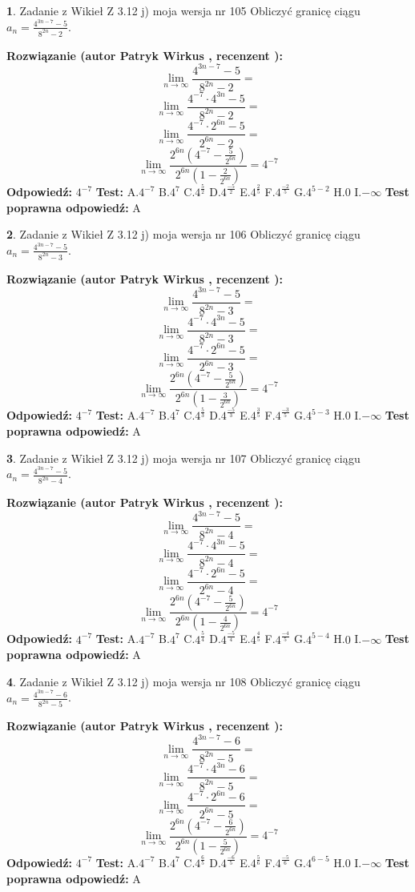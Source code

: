 \documentclass[12pt, a4paper]{article}
\theoremstyle{definition} %
\newtheorem{zad}{}
\newcommand{\zadStart}[1]{\begin{zad}#1\newline}
\newcommand{\zadStop}{\end{zad}}
\newcommand{\rozwStart}[2]{\noindent \textbf{Rozwiązanie (autor #1 , recenzent #2): }\newline}
\newcommand{\rozwStop}{\newline}
\newcommand{\odpStart}{\noindent \textbf{Odpowiedź:}\newline}
\newcommand{\odpStop}{\newline}
\newcommand{\testStart}{\noindent \textbf{Test:}\newline}
\newcommand{\testStop}{\newline}
\newcommand{\kluczStart}{\noindent \textbf{Test poprawna odpowiedź:}\newline}
\newcommand{\kluczStop}{\newline}
\begin{document}
\zadStart{Zadanie z Wikieł Z 3.12 j) moja wersja nr 105}
Obliczyć granicę ciągu $a_{n}=\frac{4^{3n-7}-5}{8^{2n}-2}$.
\zadStop
\rozwStart{Patryk Wirkus}{}
$$\lim\limits_{n\to\infty}\frac{4^{3n-7}-5}{8^{2n}-2}=$$
$$\lim\limits_{n\to\infty}\frac{4^{-7} \cdot 4^{3n}-5}{8^{2n}-2}=$$
$$\lim\limits_{n\to\infty}\frac{4^{-7} \cdot 2^{6n}-5}{2^{6n}-2}=$$
$$\lim\limits_{n\to\infty}\frac{2^{6n}(4^{-7} - \frac{5}{2^{6n}})}{2^{6n}(1-\frac{2}{2^{6n}})}= 4^{-7}$$
\rozwStop
\odpStart
$4^{-7}$
\odpStop
\testStart
A.$4^{-7}$
B.$4^{7}$
C.$4^{\frac{5}{2}}$
D.$4^{\frac{-5}{2}}$
E.$4^{\frac{2}{5}}$
F.$4^{\frac{-2}{5}}$
G.$4^{5-2}$
H.$0$
I.$-\infty$
\testStop
\kluczStart
A
\kluczStop



\zadStart{Zadanie z Wikieł Z 3.12 j) moja wersja nr 106}
Obliczyć granicę ciągu $a_{n}=\frac{4^{3n-7}-5}{8^{2n}-3}$.
\zadStop
\rozwStart{Patryk Wirkus}{}
$$\lim\limits_{n\to\infty}\frac{4^{3n-7}-5}{8^{2n}-3}=$$
$$\lim\limits_{n\to\infty}\frac{4^{-7} \cdot 4^{3n}-5}{8^{2n}-3}=$$
$$\lim\limits_{n\to\infty}\frac{4^{-7} \cdot 2^{6n}-5}{2^{6n}-3}=$$
$$\lim\limits_{n\to\infty}\frac{2^{6n}(4^{-7} - \frac{5}{2^{6n}})}{2^{6n}(1-\frac{3}{2^{6n}})}= 4^{-7}$$
\rozwStop
\odpStart
$4^{-7}$
\odpStop
\testStart
A.$4^{-7}$
B.$4^{7}$
C.$4^{\frac{5}{3}}$
D.$4^{\frac{-5}{3}}$
E.$4^{\frac{3}{5}}$
F.$4^{\frac{-3}{5}}$
G.$4^{5-3}$
H.$0$
I.$-\infty$
\testStop
\kluczStart
A
\kluczStop



\zadStart{Zadanie z Wikieł Z 3.12 j) moja wersja nr 107}
Obliczyć granicę ciągu $a_{n}=\frac{4^{3n-7}-5}{8^{2n}-4}$.
\zadStop
\rozwStart{Patryk Wirkus}{}
$$\lim\limits_{n\to\infty}\frac{4^{3n-7}-5}{8^{2n}-4}=$$
$$\lim\limits_{n\to\infty}\frac{4^{-7} \cdot 4^{3n}-5}{8^{2n}-4}=$$
$$\lim\limits_{n\to\infty}\frac{4^{-7} \cdot 2^{6n}-5}{2^{6n}-4}=$$
$$\lim\limits_{n\to\infty}\frac{2^{6n}(4^{-7} - \frac{5}{2^{6n}})}{2^{6n}(1-\frac{4}{2^{6n}})}= 4^{-7}$$
\rozwStop
\odpStart
$4^{-7}$
\odpStop
\testStart
A.$4^{-7}$
B.$4^{7}$
C.$4^{\frac{5}{4}}$
D.$4^{\frac{-5}{4}}$
E.$4^{\frac{4}{5}}$
F.$4^{\frac{-4}{5}}$
G.$4^{5-4}$
H.$0$
I.$-\infty$
\testStop
\kluczStart
A
\kluczStop



\zadStart{Zadanie z Wikieł Z 3.12 j) moja wersja nr 108}
Obliczyć granicę ciągu $a_{n}=\frac{4^{3n-7}-6}{8^{2n}-5}$.
\zadStop
\rozwStart{Patryk Wirkus}{}
$$\lim\limits_{n\to\infty}\frac{4^{3n-7}-6}{8^{2n}-5}=$$
$$\lim\limits_{n\to\infty}\frac{4^{-7} \cdot 4^{3n}-6}{8^{2n}-5}=$$
$$\lim\limits_{n\to\infty}\frac{4^{-7} \cdot 2^{6n}-6}{2^{6n}-5}=$$
$$\lim\limits_{n\to\infty}\frac{2^{6n}(4^{-7} - \frac{6}{2^{6n}})}{2^{6n}(1-\frac{5}{2^{6n}})}= 4^{-7}$$
\rozwStop
\odpStart
$4^{-7}$
\odpStop
\testStart
A.$4^{-7}$
B.$4^{7}$
C.$4^{\frac{6}{5}}$
D.$4^{\frac{-6}{5}}$
E.$4^{\frac{5}{6}}$
F.$4^{\frac{-5}{6}}$
G.$4^{6-5}$
H.$0$
I.$-\infty$
\testStop
\kluczStart
A
\kluczStop
\end{document}
